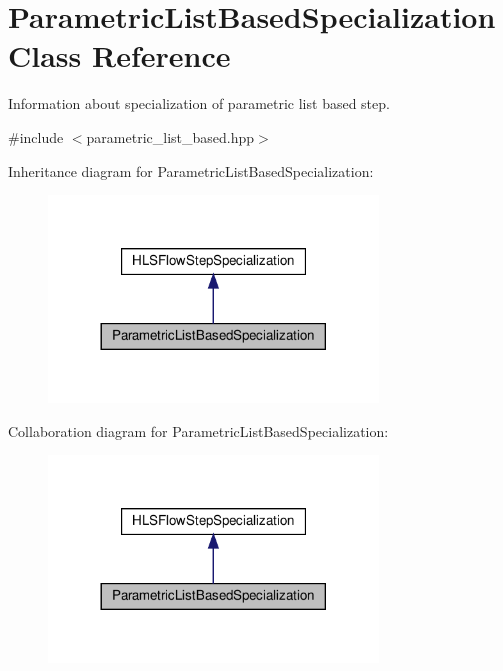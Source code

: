 \hypertarget{classParametricListBasedSpecialization}{}\section{Parametric\+List\+Based\+Specialization Class Reference}
\label{classParametricListBasedSpecialization}


Information about specialization of parametric list based step.  




{\ttfamily \#include $<$parametric\+\_\+list\+\_\+based.\+hpp$>$}



Inheritance diagram for Parametric\+List\+Based\+Specialization\+:
\nopagebreak
\begin{figure}[H]
\begin{center}
\leavevmode
\includegraphics[width=248pt]{d2/d9e/classParametricListBasedSpecialization__inherit__graph}
\end{center}
\end{figure}


Collaboration diagram for Parametric\+List\+Based\+Specialization\+:
\nopagebreak
\begin{figure}[H]
\begin{center}
\leavevmode
\includegraphics[width=248pt]{d4/d59/classParametricListBasedSpecialization__coll__graph}
\end{center}
\end{figure}
